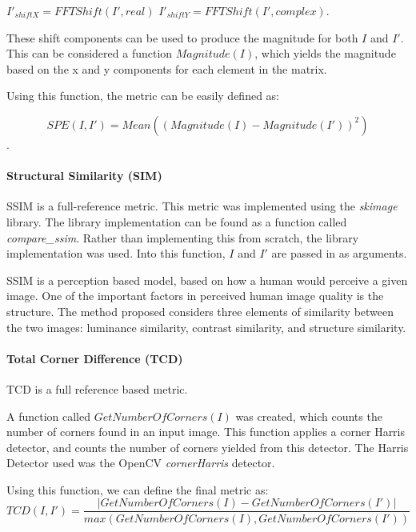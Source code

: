 \documentclass[10pt,a4paper]{article}
\begin{document}
                $I'_{shiftX} = FFTShift(I', real)$
                $I'_{shiftY} = FFTShift(I', complex)$.

                These shift components can be used to produce the magnitude for both $I$ and $I'$. This can be considered a function $Magnitude(I)$, which yields the magnitude based on the
                x and y components for each element in the matrix.

                Using this function, the metric can be easily defined as:

                $$SPE(I, I') = Mean((Magnitude(I) - Magnitude(I'))^2)$$.

            \paragraph{Structural Similarity (SIM)}
                SSIM is a full-reference metric. This metric was implemented using the \emph{skimage} library. The library implementation can be found as a function called \emph{compare\_ssim}.
                Rather than implementing this from scratch, the library implementation was used. Into this function, $I$ and $I'$ are passed in as arguments.

                SSIM is a perception based model, based on how a human would perceive a given image. One of the important factors in perceived human image quality is the structure.
                The method proposed considers three elements of similarity between the two images: luminance similarity, contrast similarity, and structure similarity.
                \cite{SSIMPaper}

            \paragraph{Total Corner Difference (TCD)}
                TCD is a full reference based metric. 
                
                A function called $GetNumberOfCorners(I)$ was created, which counts the number of corners found in an input image. This function applies a corner Harris detector,
                and counts the number of corners yielded from this detector. The Harris Detector used was the OpenCV \emph{cornerHarris} detector. 


                Using this function, we can define the final metric as: 
                $$TCD(I, I') = \frac{|GetNumberOfCorners(I) - GetNumberOfCorners(I')|}{max({GetNumberOfCorners(I), GetNumberOfCorners(I')})}$$
\end{document}

